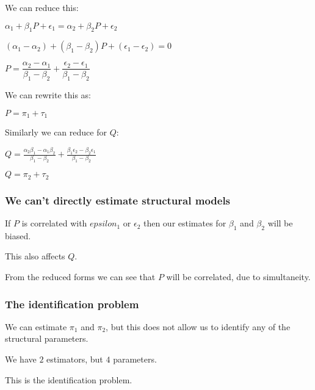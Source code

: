 We can reduce this:

\(\alpha_1 + \beta_1 P + \epsilon_1 =\alpha_2 + \beta_2 P + \epsilon_2 \)

\((\alpha_1 -\alpha_2 )+ (\beta_1 -\beta_2 )P + (\epsilon_1 -\epsilon_2 )=0\)

\(P =\dfrac{\alpha_2-\alpha_1 }{\beta_1-\beta_2}+\dfrac{\epsilon_2-\epsilon_1 }{\beta_1-\beta_2}\)

We can rewrite this as:

\(P=\pi_1 + \tau_1 \)

Similarly we can reduce for \(Q\):

\(Q =\frac{\alpha_2\beta_1-\alpha_1\beta_2 }{\beta_1-\beta_2}+\frac{\beta_1\epsilon_2 -\beta_2\epsilon_1}{\beta_1-\beta_2}\)

\(Q= \pi_2 + \tau_2\)

\subsubsection{We can't directly estimate structural models}

If \(P\) is correlated with \(epsilon_1\) or \(\epsilon_2\) then our estimates for \(\beta_1\) and \(\beta_2\) will be biased.

This also affects \(Q\).

From the reduced forms we can see that \(P\) will be correlated, due to simultaneity.

\subsubsection{The identification problem}

We can estimate \(\pi_1 \) and \(\pi_2\), but this does not allow us to identify any of the structural parameters.

We have \(2\) estimators, but \(4\) parameters.

This is the identification problem.

